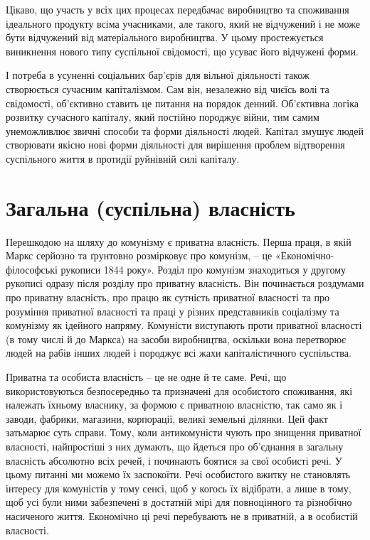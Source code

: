 \documentclass[12pt,a4paper,openany]{book}
\begin{document}
Цікаво, що участь у всіх цих процесах передбачає виробництво та споживання ідеального продукту всіма учасниками, але такого, який не відчужений і не може бути відчужений від матеріального виробництва. У цьому простежується виникнення нового типу суспільної свідомості, що усуває його відчужені форми.

І потреба в усуненні соціальних бар’єрів для вільної діяльності також створюється сучасним капіталізмом. Сам він, незалежно від чиєїсь волі та свідомості, об’єктивно ставить це питання на порядок денний. Об’єктивна логіка розвитку сучасного капіталу, який постійно породжує війни, тим самим унеможливлює звичні способи та форми діяльності людей. Капітал змушує людей створювати якісно нові форми діяльності для вирішення проблем відтворення суспільного життя в протидії руйнівній силі капіталу.
\ifSubfilesClassLoaded{\setcounter{page}{27}}{}
\section{Загальна (суспільна) власність}
\label{sec:05_obshhaya_sobstvennost}

Перешкодою на шляху до комунізму є приватна власність. Перша праця, в якій Маркс серйозно та ґрунтовно розмірковує про комунізм, – це «Економічно-філософські рукописи 1844 року». Розділ про комунізм знаходиться у другому рукописі одразу після розділу про приватну власність. Він починається роздумами про приватну власність, про працю як сутність приватної власності та про розуміння приватної власності та праці у різних представників соціалізму та комунізму як ідейного напряму. Комуністи виступають проти приватної власності (в тому числі й до Маркса) на засоби виробництва, оскільки вона перетворює людей на рабів інших людей і породжує всі жахи капіталістичного суспільства.

Приватна та особиста власність – це не одне й те саме. Речі, що використовуються безпосередньо та призначені для особистого споживання, які належать їхньому власнику, за формою є приватною власністю, так само як і заводи, фабрики, магазини, корпорації, великі земельні ділянки. Цей факт затьмарює суть справи. Тому, коли антикомуністи чують про знищення приватної власності, найпростіші з них думають, що йдеться про об’єднання в загальну власність абсолютно всіх речей, і починають боятися за свої особисті речі. У цьому питанні ми можемо їх заспокоїти. Речі особистого вжитку не становлять інтересу для комуністів у тому сенсі, щоб у когось їх відібрати, а лише в тому, щоб усі були ними забезпечені в достатній мірі для повноцінного та різнобічно насиченого життя. Економічно ці речі перебувають не в приватній, а в особистій власності.
\end{document}
